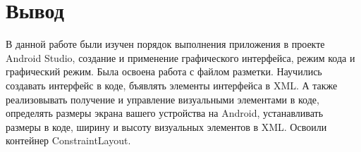 \clearpage

\section*{\LARGE{Вывод}}
В данной работе были изучен порядок выполнения приложения
в проекте Android Studio, создание и применение графического интерфейса,
режим кода и графический режим. Была освоена работа с файлом разметки.
Научились создавать интерфейс в коде, бъявлять элементы интерфейса в XML.
А также реализовывать получение и управление визуальными элементами в коде,
определять размеры экрана вашего устройства на Android,
устанавливать размеры в коде, ширину и высоту визуальных элементов в XML.
Освоили контейнер ConstraintLayout.

